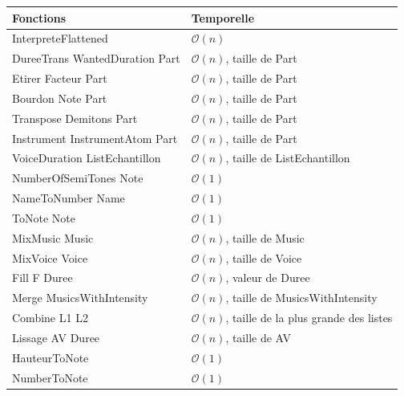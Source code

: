 \documentclass[10pt,a4paper]{article}
\begin{document}
\begin{center}
		\begin{tabular}{|l|l|}
		\hline
		\textbf{Fonctions}																& \textbf{Temporelle}								\\
		\hline
		InterpreteFlattened																& $\mathcal{O}(n)$ 									\\
		\hline
		DureeTrans WantedDuration Part 										& $\mathcal{O}(n)$, taille de Part								\\
		\hline 
		Etirer Facteur Part																& $\mathcal{O}(n)$, taille de Part 						 	\\
		\hline
		Bourdon Note Part																	& $\mathcal{O}(n)$, taille de Part 						 	\\
		\hline
		Transpose Demitons Part														& $\mathcal{O}(n)$, taille de Part 						 	\\
		\hline
		Instrument InstrumentAtom Part										& $\mathcal{O}(n)$, taille de Part								\\
		\hline
		VoiceDuration ListEchantillon											& $\mathcal{O}(n)$, taille de ListEchantillon	 	\\
		\hline
		NumberOfSemiTones Note														& $\mathcal{O}(1)$ 														 	\\
		\hline
		NameToNumber Name																	& $\mathcal{O}(1)$ 														 	\\
		\hline
		ToNote Note																				& $\mathcal{O}(1)$ 															 \\ 
		\hline
		\hline
		MixMusic Music																		& $\mathcal{O}(n)$, taille de Music						 \\
		\hline
		MixVoice Voice																		& $\mathcal{O}(n)$, taille de Voice						 \\
		\hline
		Fill F Duree																			& $\mathcal{O}(n)$, valeur de Duree						 \\
		\hline
		Merge MusicsWithIntensity													& $\mathcal{O}(n)$, taille de MusicsWithIntensity	 \\
		\hline
		Combine L1 L2																			& $\mathcal{O}(n)$, taille de la plus grande des listes	 \\
		\hline
		Lissage AV Duree																	& $\mathcal{O}(n)$, taille de AV								 \\
		\hline
		HauteurToNote																			& $\mathcal{O}(1)$ 														 \\
		\hline
		NumberToNote																			& $\mathcal{O}(1)$ 														 \\
		\hline
		\end{tabular}
\end{center}
\end{document}
